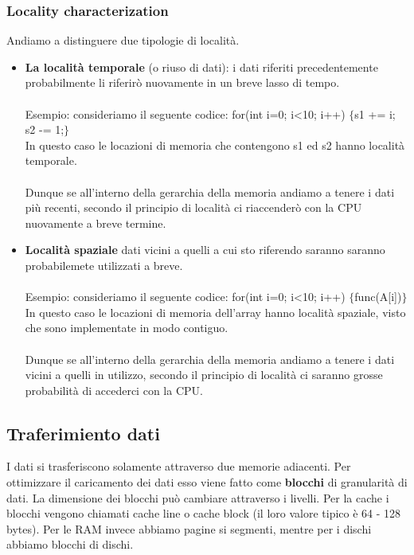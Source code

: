 \subsubsection{Locality characterization}
Andiamo a distinguere due tipologie di località. 
\begin{itemize}
    \item \textbf{La località temporale} (o riuso di dati): i dati riferiti precedentemente probabilmente li riferirò nuovamente in un breve lasso di tempo. \\\\Esempio: consideriamo il seguente codice: for(int i=0; i<10; i++) $\{$s1 += i; s2 -= 1;$\}$\\
    In questo caso le locazioni di memoria che contengono s1 ed s2 hanno località temporale.\\\\
    Dunque se all'interno della gerarchia della memoria andiamo a tenere i dati più recenti, secondo il principio di località ci riaccenderò con la CPU nuovamente a breve termine.
    \item \textbf{Località spaziale} dati vicini a quelli a cui sto riferendo saranno saranno probabilemete utilizzati a breve.
    \\\\Esempio: consideriamo il seguente codice: for(int i=0; i<10; i++) $\{$func(A[i])$\}$\\
    In questo caso le locazioni di memoria dell'array hanno località spaziale, visto che sono implementate in modo contiguo.\\\\
    Dunque se all'interno della gerarchia della memoria andiamo a tenere i dati vicini a quelli in utilizzo, secondo il principio di località ci saranno grosse probabilità di accederci con la CPU.
\end{itemize}


\subsection{Traferimiento dati}
I dati si trasferiscono solamente attraverso due memorie adiacenti. Per ottimizzare il caricamento dei dati esso viene fatto come \textbf{blocchi} di granularità di dati. La dimensione dei blocchi può cambiare attraverso i livelli. Per la cache i blocchi vengono chiamati cache line o cache block (il loro valore tipico è 64 - 128 bytes). Per le RAM invece abbiamo pagine si segmenti, mentre per i dischi abbiamo blocchi di dischi.\\

